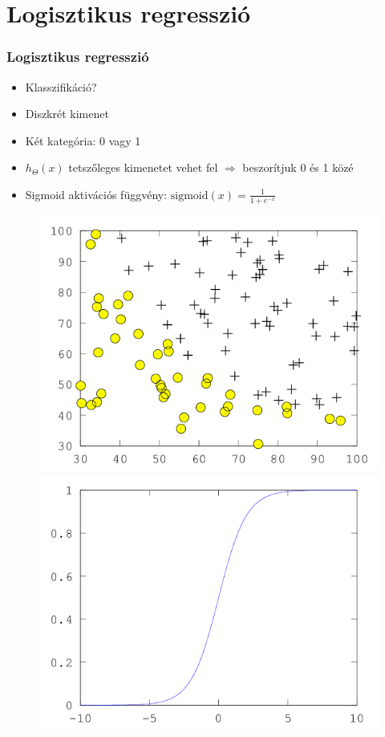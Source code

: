 \documentclass{beamer}
\begin{document}
\section{Logisztikus regresszió}
\begin{frame}
\frametitle{Logisztikus regresszió}
\begin{minipage}{0.48\textwidth}
\begin{itemize}
  \setlength{\itemsep}{16pt}
\item Klasszifikáció?
\item Diszkrét kimenet
\item Két kategória: 0 vagy 1
\item $h_\Theta(x)$ tetszőleges kimenetet vehet fel $\Rightarrow$ beszorítjuk 0 és 1 közé
\item Sigmoid aktivációs függvény: $\mathrm{sigmoid}(x)=\frac{1}{1+e^{-x}}$
\end{itemize}
\end{minipage}
\begin{minipage}{0.48\textwidth}
\begin{figure}
\centering
	\includegraphics[scale=0.55]{pic/nn/1}\\
	\includegraphics[scale=0.55]{pic/nn/2}
\end{figure}
\end{minipage}
\end{frame}
\end{document}
